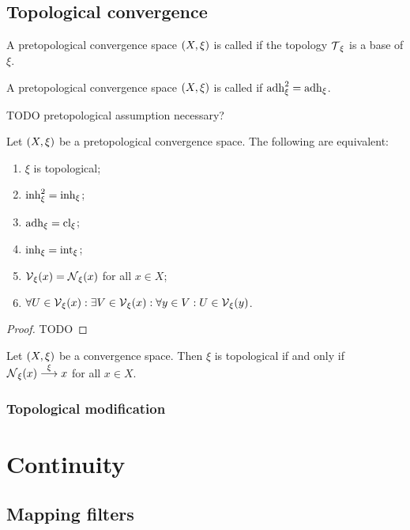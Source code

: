 \section{Topological convergence}
\begin{definition}
A pretopological convergence space $\left( X,\xi \right)$ is called  if the topology $\operatorname{\mathcal{T}}_\xi$ is a base of $\xi$.
\end{definition}
\begin{definition}
A pretopological convergence space $\left( X,\xi \right)$ is called  if $\operatorname{adh}_\xi^2 = \operatorname{adh}_\xi$.
\end{definition}
TODO pretopological assumption necessary?

\begin{proposition} \label{pretopologicalSpaceTopological}
Let $\left( X,\xi \right)$ be a pretopological convergence space. The following are equivalent:
\begin{enumerate}
\item $\xi$ is topological;
\item $\operatorname{inh}_\xi^2 = \operatorname{inh}_\xi$;
\item $\operatorname{adh}_\xi = \operatorname{cl}_\xi$;
\item $\operatorname{inh}_\xi = \operatorname{int}_\xi$;
\item $\operatorname{\mathcal{V}}_\xi(x) = \operatorname{\mathcal{N}}_\xi(x)$ for all $x\in X$;
\item $\forall U\in \operatorname{\mathcal{V}}_\xi(x): \exists V\in \operatorname{\mathcal{V}}_\xi(x): \forall y\in V: U\in\operatorname{\mathcal{V}}_\xi(y)$.
\end{enumerate}
\end{proposition}
\begin{proof}
TODO
\end{proof}
\begin{corollary}
Let $\left( X,\xi \right)$ be a convergence space. Then $\xi$ is topological \textup{if and only if} $\operatorname{\mathcal{N}}_\xi(x) \overset{\xi}{\longrightarrow} x$ for all $x\in X$.
\end{corollary}

\subsection{Topological modification}


\chapter{Continuity}

\section{Mapping filters}

